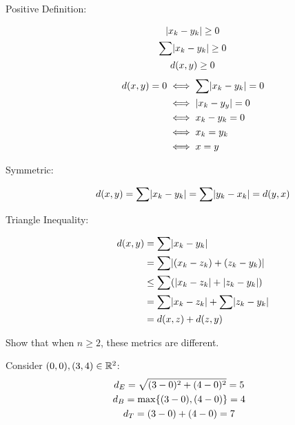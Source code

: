 \documentclass[letterpaper,12pt,fleqn]{article}
\begin{document}
\begin{examples}
\begin{enumerate}
    \begin{description}
    \item[Positive Definition:]
      \begin{gather*}
        \lvert x_k-y_k\rvert\ge0 \\
        \sum\lvert x_k-y_k\rvert\ge0 \\
        d(x,y)\ge0
      \end{gather*}
      \begin{align*}
        d(x,y)=0 &\iff \sum\lvert x_k-y_k\rvert=0 \\
        &\iff \lvert x_k-y_y\rvert=0 \\
        &\iff x_k-y_k=0 \\
        &\iff x_k=y_k \\
        &\iff x=y
      \end{align*}
    \item[Symmetric:]
      \[d(x,y)=\sum\lvert x_k-y_k\rvert=\sum\lvert y_k-x_k\rvert=d(y,x)\]
    \item[Triangle Inequality:]
      \begin{align*}
        d(x,y) &= \sum\lvert x_k-y_k\rvert \\
        &= \sum\lvert(x_k-z_k)+(z_k-y_k)\rvert \\
        &\le \sum(\lvert x_k-z_k\rvert+\lvert z_k-y_k\rvert) \\
        &= \sum\lvert x_k-z_k\rvert+\sum\lvert z_k-y_k\rvert \\
        &= d(x,z)+d(z,y)
      \end{align*}
    \end{description}
  \end{enumerate}

  Show that when \(n\ge2\), these metrics are different.

  Consider \((0,0),(3,4)\in\mathbb{R}^2\):
  \begin{gather*}
    d_E=\sqrt{(3-0)^2+(4-0)^2}=5 \\
    d_B=\max\{(3-0),(4-0)\}=4 \\
    d_T=(3-0)+(4-0)=7
  \end{gather*}
\end{examples}
\end{document}
